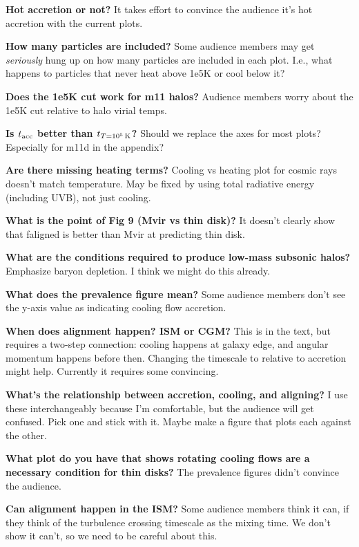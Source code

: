 

\textbf{Hot accretion or not?}
It takes effort to convince the audience it's hot accretion with the current plots.

\textbf{How many particles are included?}
Some audience members may get \textit{seriously} hung up on how many particles are included in each plot.
I.e., what happens to particles that never heat above 1e5K or cool below it?

\textbf{Does the 1e5K cut work for m11 halos?}
Audience members worry about the 1e5K cut relative to halo virial temps.

\textbf{Is $t_{\rm acc}$ better than $t_{T=10^5\,{\rm K}}$?}
Should we replace the axes for most plots?
Especially for m11d in the appendix?

\textbf{Are there missing heating terms?}
Cooling vs heating plot for cosmic rays doesn't match temperature.
May be fixed by using total radiative energy (including UVB), not just cooling.

\textbf{What is the point of Fig 9 (Mvir vs thin disk)?}
It doesn't clearly show that faligned is better than Mvir at predicting thin disk.

\textbf{What are the conditions required to produce low-mass subsonic halos?}
Emphasize baryon depletion.
I think we might do this already.

\textbf{What does the prevalence figure mean?}
Some audience members don't see the y-axis value as indicating cooling flow accretion.

\textbf{When does alignment happen? ISM or CGM?}
This is in the text, but requires a two-step connection:
cooling happens at galaxy edge,
and angular momentum happens before then.
Changing the timescale to relative to accretion might help.
Currently it requires some convincing.

\textbf{What's the relationship between accretion, cooling, and aligning?}
I use these interchangeably because I'm comfortable, but the audience will get confused.
Pick one and stick with it.
Maybe make a figure that plots each against the other.

\textbf{What plot do you have that shows rotating cooling flows are a necessary condition for thin disks?}
The prevalence figures didn't convince the audience.

\textbf{Can alignment happen in the ISM?}
Some audience members think it can, if they think of the turbulence crossing timescale as the mixing time.
We don't show it can't, so we need to be careful about this.

